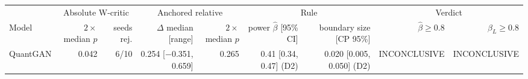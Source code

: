 \begin{tabular}{lrrrrrrrr}
\toprule
 & \multicolumn{2}{c}{Absolute W-critic} & \multicolumn{2}{c}{Anchored relative} & \multicolumn{2}{c}{Rule} & \multicolumn{2}{c}{Verdict} \\
\cmidrule(lr){2-3} \cmidrule(lr){4-5} \cmidrule(lr){6-7} \cmidrule(lr){8-9}
Model & $2\times$median $p$ & seeds rej. & $\Delta$ median [range] & $2\times$median $p$ & power $\hat\beta$ [95\% CI] & boundary size [CP 95\%] & $\hat\beta\ge0.8$ & $\beta_L\ge0.8$ \\
\midrule
QuantGAN & 0.042 & 6/10 & 0.254 [$-$0.351, 0.659] & 0.265 & 0.41 [0.34, 0.47] (D2) & 0.020 [0.005, 0.050] (D2) & INCONCLUSIVE & INCONCLUSIVE \\
\bottomrule
\end{tabular}

